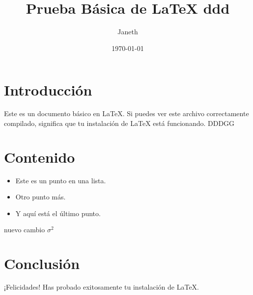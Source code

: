 \documentclass{article}
\title{Prueba Básica de LaTeX ddd}
\author{Janeth}
\date{\today}
\begin{document}
\maketitle

\section{Introducción}
Este es un documento básico en \LaTeX. Si puedes ver este archivo correctamente compilado, significa que tu instalación de \LaTeX{} está funcionando.
DDDGG
\section{Contenido}
\begin{itemize}
    \item Este es un punto en una lista.
    \item Otro punto más.
    \item Y aquí está el último punto.
\end{itemize}

nuevo cambio
$\sigma^2$

\section{Conclusión}
¡Felicidades! Has probado exitosamente tu instalación de \LaTeX.
\end{document}
